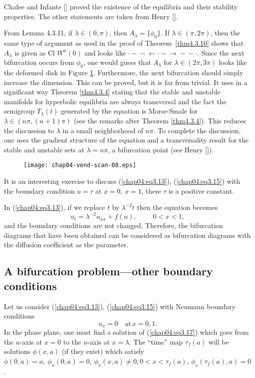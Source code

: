 \documentclass{surv-l}
\theoremstyle{plain}
\theoremstyle{definition}
\numberwithin{equation}{section}
\numberwithin{figure}{chapter}
\begin{document}
Chafee and Infante [\citeyear{1974ci}] proved the existence of the equilibria and their stability properties. The other statements are taken from Henry [\citeyear{1981henry}].

From Lemma 4.3.11, if $\lambda \in(0,\pi)$, then $A_{\lambda}=\{\phi_{0}\}$. If $\lambda\in(\pi, 2\pi)$, then the same type of argument as used in the proof of Theorem~\ref{thm4.3.10} shows that $A_{\lambda}$ is given as Cl $W^{u}(0)$ and looks like $\cdot-\!\!\!-\!\!\!\leftarrow\cdot-\!\!\!\rightarrow\!\!\!-\!\!\!-\cdot$. Since the next bifurcation occurs from $\phi_{0}$, one would guess that $A_{\lambda}$ for $\lambda \in(2\pi, 3\pi)$ looks like the deformed disk in Figure \ref{fig3.6}. Furthermore, the next bifurcation should simply increase the dimension. This can be proved, but it is far from trivial. It uses in a significant
way Theorem \ref{thm4.3.4} stating that the stable and unstable manifolds for hyperbolic equilibria are always transversal and the fact the semigroup $T_{\lambda}(t)$ generated by the equation is Morse-Smale for $\lambda\in(n\pi, (n+1)\pi)$ (see the remarks after Theorem \ref{thm4.3.4}). This reduces the discussion to $\lambda$ in a small neighborhood of $n\pi$. To complete the discussion, one uses the gradient structure of the equation and a transversality result for the stable and unstable sets at $\lambda=n\pi$, a bifurcation point (see Henry [\citeyear{1985henry}]).

\begin{figure}
\texttt{[image: chap04-vend-scan-08.eps]}
\caption{}\label{fig3.6}
\end{figure}

It is an interesting exercise to discuss (\ref{chap04:eq3.13}), (\ref{chap04:eq3.15}) with the boundary condition $ u=\tau$ at $x=0,\ x=1$, there $\tau$ is a positive constant.

In (\ref{chap04:eq3.13}), if we replace $t$ by $\lambda^{-2}t$ then the equation becomes
\begin{equation*}
u_{t}=\lambda^{-2}u_{xx}+f(u),\,\qquad\, 0<x<1,
\end{equation*}
and the boundary conditions are not changed. Therefore, the bifurcation diagrams that have been obtained can be considered as bifurcation diagrams with the diffusion coefficient as the parameter.

\subsection{A bifurcation problem---other boundary conditions} Let us consider (\ref{chap04:eq3.13}), (\ref{chap04:eq3.15}) with Neumann boundary conditions
\begin{equation}\label{chap04:eq3.22}
u_{x}=0 \quad \mathrm{at}\, x=0,1.
\end{equation}
In the phase plane, one must find a solution of (\ref{chap04:eq3.17}) which goes from the $u$-axis at $x=0$ to the $u$-axis at $ x=\lambda$. The ``time'' map $\tau_{f}(a)$ will be solutions $\phi(x, a)$ (if they exist) which satisfy $\phi(0, a)=a,\ \phi_{x}(0, a)=0,\ \phi_{x}(x, a)\neq 0,0<x<\tau_{f}(a)$, $\phi_{x}(\tau_{f}(a), a)=0$.
\end{document}
